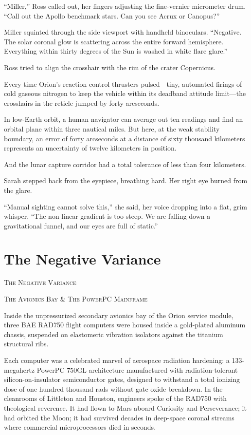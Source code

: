 \documentclass[12pt,twoside,openright]{book}
\newcommand{\sceneheader}[1]{%
  \par\vspace{1.8em}%
  {\noindent\centering\scshape\large #1\par}%
  \vspace{1.0em}%
  \noindent%
}
\begin{document}
``Miller,'' Ross called out, her fingers adjusting the fine-vernier
micrometer drum. ``Call out the Apollo benchmark stars. Can you see
Acrux or Canopus?''

Miller squinted through the side viewport with handheld binoculars.
``Negative. The solar coronal glow is scattering across the entire
forward hemisphere. Everything within thirty degrees of the Sun is
washed in white flare glare.''

Ross tried to align the crosshair with the rim of the crater Copernicus.

Every time Orion's reaction control thrusters pulsed---tiny, automated
firings of cold gaseous nitrogen to keep the vehicle within its deadband
attitude limit---the crosshairs in the reticle jumped by forty
arcseconds.

In low-Earth orbit, a human navigator can average out ten readings and
find an orbital plane within three nautical miles. But here, at the weak
stability boundary, an error of forty arcseconds at a distance of sixty
thousand kilometers represents an uncertainty of twelve kilometers in
position.

And the lunar capture corridor had a total tolerance of less than four
kilometers.

Sarah stepped back from the eyepiece, breathing hard. Her right eye
burned from the glare.

``Manual sighting cannot solve this,'' she said, her voice dropping into
a flat, grim whisper. ``The non-linear gradient is too steep. We are
falling down a gravitational funnel, and our eyes are full of static.''

\chapter{The Negative Variance}
\sceneheader{The Negative Variance}

\sceneheader{The Avionics Bay \& The PowerPC
Mainframe}

Inside the unpressurized secondary avionics bay of the Orion service
module, three BAE RAD750 flight computers were housed inside a
gold-plated aluminum chassis, suspended on elastomeric vibration
isolators against the titanium structural ribs.

Each computer was a celebrated marvel of aerospace radiation hardening:
a 133-megahertz PowerPC 750GL architecture manufactured with
radiation-tolerant silicon-on-insulator semiconductor gates, designed to
withstand a total ionizing dose of one hundred thousand rads without
gate oxide breakdown. In the cleanrooms of Littleton and Houston,
engineers spoke of the RAD750 with theological reverence. It had flown
to Mars aboard Curiosity and Perseverance; it had orbited the Moon; it
had survived decades in deep-space coronal streams where commercial
microprocessors died in seconds.
\end{document}
